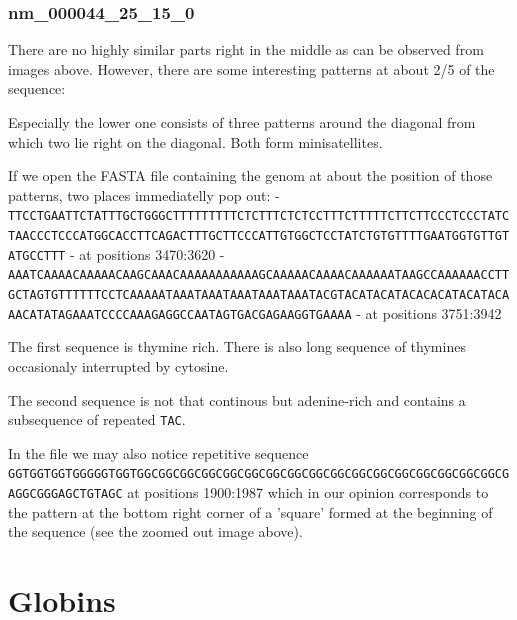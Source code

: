 \documentclass[11pt]{article}
\begin{document}
    \subsubsection{nm\_000044\_25\_15\_0}\label{nm_000044_25_15_0}

    There are no highly similar parts right in the middle as can be observed
from images above. However, there are some interesting patterns at about
2/5 of the sequence:

    

    

    Especially the lower one consists of three patterns around the diagonal
from which two lie right on the diagonal. Both form minisatellites.

If we open the FASTA file containing the genom at about the position of
those patterns, two places immediatelly pop out: -
\texttt{TTCCTGAATTCTATTTGCTGGGCTTTTTTTTTCTCTTTCTCTCCTTTCTTTTTCTTCTTCCCTCCCTATCTAACCCTCCCATGGCACCTTCAGACTTTGCTTCCCATTGTGGCTCCTATCTGTGTTTTGAATGGTGTTGTATGCCTTT}
- at positions 3470:3620 -
\texttt{AAATCAAAACAAAAACAAGCAAACAAAAAAAAAAAGCAAAAACAAAACAAAAAATAAGCCAAAAAACCTTGCTAGTGTTTTTTCCTCAAAAATAAATAAATAAATAAATAAATACGTACATACATACACACATACATACAAACATATAGAAATCCCCAAAGAGGCCAATAGTGACGAGAAGGTGAAAA}
- at positions 3751:3942

The first sequence is thymine rich. There is also long sequence of
thymines occasionaly interrupted by cytosine.

The second sequence is not that continous but adenine-rich and contains
a subsequence of repeated \texttt{TAC}.

In the file we may also notice repetitive sequence
\texttt{GGTGGTGGTGGGGGTGGTGGCGGCGGCGGCGGCGGCGGCGGCGGCGGCGGCGGCGGCGGCGGCGGCGGCGAGGCGGGAGCTGTAGC}
at positions 1900:1987 which in our opinion corresponds to the pattern
at the bottom right corner of a 'square' formed at the beginning of the
sequence (see the zoomed out image above).

    \section{Globins}\label{globins}
\end{document}
